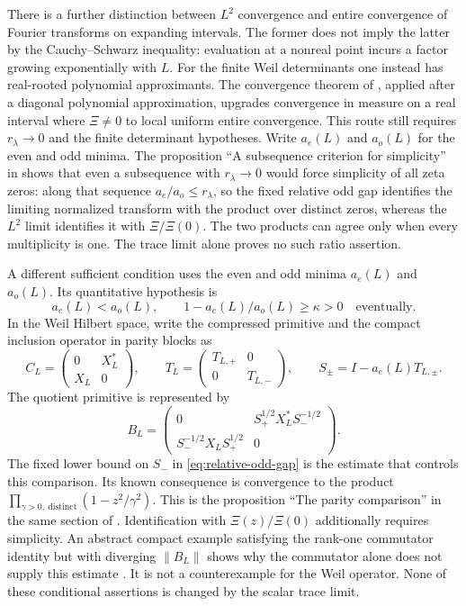 There is a further distinction between $L^2$ convergence and entire
convergence of Fourier transforms on expanding intervals. The former
does not imply the latter by the Cauchy--Schwarz inequality: evaluation
at a nonreal point incurs a factor growing exponentially with $L$.
For the finite Weil determinants one instead has real-rooted polynomial
approximants. The convergence theorem of
\citet[Corollary~1.3, p.~110]{cluniekuijlaars1994}, applied after
a diagonal polynomial approximation, upgrades convergence in measure
on a real interval where $\Xi\ne0$ to local uniform entire convergence.
This route still requires $r_\lambda\to0$ and the finite determinant
hypotheses. Write $a_e(L)$ and $a_o(L)$ for the even and odd minima.
The proposition ``A subsequence criterion for simplicity'' in
\citet[section ``The lowest Weil eigenvector and the simplicity question'']
{simplicitynotes} shows that even a subsequence with
$r_\lambda\to0$ would force simplicity of all zeta zeros: along
that sequence $a_e/a_o\leq r_\lambda$, so the fixed relative odd
gap identifies the limiting normalized transform with the product
over distinct zeros, whereas the $L^2$ limit identifies it with
$\Xi/\Xi(0)$. The two products can agree only when every
multiplicity is one. The trace limit alone proves no such ratio assertion.

A different sufficient condition uses the even and odd minima
$a_e(L)$ and $a_o(L)$. Its quantitative hypothesis is
\begin{equation}\label{eq:relative-odd-gap}
 a_e(L)<a_o(L),\qquad
 1-a_e(L)/a_o(L)\geq\kappa>0
 \quad\text{eventually}.
\end{equation}
In the Weil Hilbert space, write the compressed primitive and the
compact inclusion operator in parity blocks as
\[
 C_L=\begin{pmatrix}0&X_L^*\\X_L&0\end{pmatrix},\qquad
 T_L=\begin{pmatrix}T_{L,+}&0\\0&T_{L,-}\end{pmatrix},\qquad
 S_\pm=I-a_e(L)T_{L,\pm}.
\]
The quotient primitive is represented by
\[
 B_L=\begin{pmatrix}
 0&S_+^{1/2}X_L^*S_-^{-1/2}\\
 S_-^{-1/2}X_LS_+^{1/2}&0
 \end{pmatrix}.
\]
The fixed lower bound on $S_-$ in
\eqref{eq:relative-odd-gap} is the estimate that controls this
comparison. Its known consequence is convergence to the product
$\prod_{\gamma>0,\ \mathrm{distinct}}(1-z^2/\gamma^2)$.
This is the proposition ``The parity comparison'' in the same
section of \citet{simplicitynotes}.
Identification with $\Xi(z)/\Xi(0)$ additionally requires simplicity.
An abstract compact example satisfying the rank-one commutator
identity but with diverging $\|B_L\|$ shows why the commutator alone
does not supply this estimate
\citep[proposition ``Exact commutator without uniform comparison'']
{commutatornotes}. It is not a counterexample for the
Weil operator. None of these conditional assertions is changed by
the scalar trace limit.

